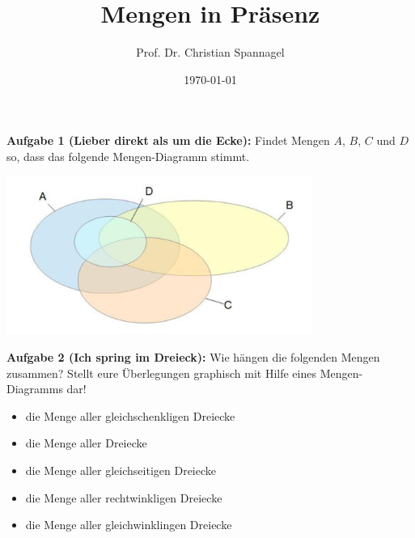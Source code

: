 \documentclass{../cssheet}
\title{Mengen in Präsenz}
\author{Prof. Dr. Christian Spannagel}
\date{\today}
\begin{document}
\printtitle

\vspace*{10mm}


\textbf{Aufgabe 1 (Lieber direkt als um die Ecke):}  Findet Mengen $A$, $B$, $C$ und $D$ so, dass das folgende Mengen-Diagramm stimmt.

\begin{center}
\includegraphics[width=10cm]{venn.png}
\end{center}


\textbf{Aufgabe 2 (Ich spring im Dreieck):} Wie hängen die folgenden Mengen zusammen?
Stellt eure Überlegungen graphisch mit Hilfe eines Mengen-Diagramms dar!

\begin{itemize}
\item die Menge aller gleichschenkligen Dreiecke
\item die Menge aller Dreiecke
\item die Menge aller gleichseitigen Dreiecke
\item die Menge aller rechtwinkligen Dreiecke
\item die Menge aller gleichwinklingen Dreiecke
\end{itemize}

\vspace*{10mm}
\printlicense

\printsocials
\end{document}

